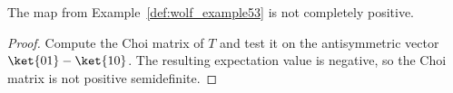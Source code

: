\begin{theorem}\label{thm:wolf_example53_not_cp}
    \leanok
    The map from Example~\ref{def:wolf_example53} is not completely positive.
\end{theorem}

\begin{proof}
    \leanok
    Compute the Choi matrix of $T$ and test it on the antisymmetric vector
    $\ket{01} - \ket{10}$.
    The resulting expectation value is negative, so the Choi matrix is not
    positive semidefinite.
\end{proof}

